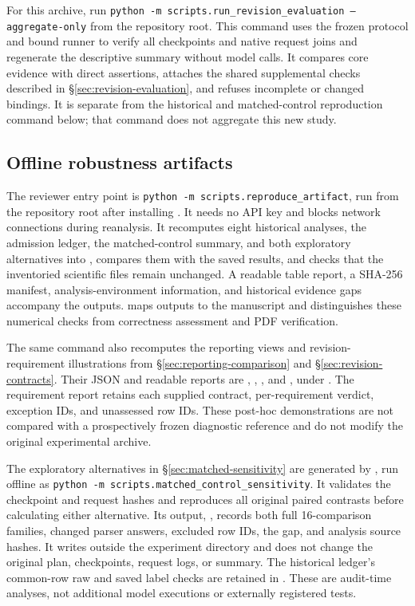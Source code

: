 \documentclass[11pt]{article}
\begin{document}
For this archive, run
\texttt{python -m scripts.run\_revision\_evaluation --aggregate-only}
from the repository root. This command uses the frozen protocol and bound
runner to verify all checkpoints and native request joins and regenerate
the descriptive summary without model calls. It compares core evidence with
direct assertions, attaches the shared supplemental checks described in
\S\ref{sec:revision-evaluation}, and refuses incomplete or changed bindings.
It is separate from the historical and matched-control
reproduction command below; that command does not aggregate this new study.

\subsection{Offline robustness artifacts}
The reviewer entry point is
\texttt{python -m scripts.reproduce\_artifact}, run from the repository root
after installing . It needs no API key and
blocks network connections during reanalysis. It recomputes eight historical
analyses, the admission ledger, the matched-control summary, and both
exploratory alternatives into , compares them with
the saved results, and checks that the inventoried scientific files remain
unchanged. A readable table report, a SHA-256 manifest, analysis-environment
information, and historical evidence gaps accompany the outputs.
 maps outputs to the manuscript and distinguishes
these numerical checks from correctness assessment and PDF verification.

The same command also recomputes the reporting views and revision-requirement
illustrations from \S\ref{sec:reporting-comparison} and
\S\ref{sec:revision-contracts}. Their JSON and readable reports are
, ,
, and , under
. The requirement report retains each supplied
contract, per-requirement verdict, exception IDs, and unassessed row IDs.
These post-hoc demonstrations are not compared with a prospectively frozen
diagnostic reference and do not modify the original experimental archive.

The exploratory alternatives in \S\ref{sec:matched-sensitivity} are generated
by , run offline as
\texttt{python -m scripts.matched\_control\_sensitivity}. It validates the
checkpoint and request hashes and reproduces all original paired contrasts
before calculating either alternative. Its output,
, records both full
16-comparison families, changed parser answers, excluded row IDs, the gap,
and analysis source hashes. It writes outside the experiment directory and
does not change the original plan, checkpoints, request logs, or summary.
The historical ledger's common-row raw and saved label checks are retained
in . These are audit-time
analyses, not additional model executions or externally registered tests.
\end{document}
